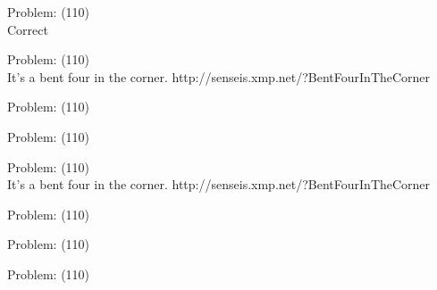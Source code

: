 \documentclass[11pt]{article}
\begin{document}
\begin{minipage}[t]{0.5\textwidth}
  {\centering
  
Problem: (110)\\
Correct\\
  }
\end{minipage}
\begin{minipage}[t]{0.5\textwidth}
  {\centering
  
Problem: (110)\\
It's a bent four in the corner. 
http://senseis.xmp.net/?BentFourInTheCorner\\
  }
\end{minipage}
\begin{minipage}[t]{0.5\textwidth}
  {\centering
  
Problem: (110)\\
  }
\end{minipage}
\begin{minipage}[t]{0.5\textwidth}
  {\centering
  
Problem: (110)\\
  }
\end{minipage}
\begin{minipage}[t]{0.5\textwidth}
  {\centering
  
Problem: (110)\\
It's a bent four in the corner. 
http://senseis.xmp.net/?BentFourInTheCorner\\
  }
\end{minipage}
\begin{minipage}[t]{0.5\textwidth}
  {\centering
  
Problem: (110)\\
  }
\end{minipage}
\begin{minipage}[t]{0.5\textwidth}
  {\centering
  
Problem: (110)\\
  }
\end{minipage}
\begin{minipage}[t]{0.5\textwidth}
  {\centering
  
Problem: (110)\\
  }
\end{minipage}
\end{document}
